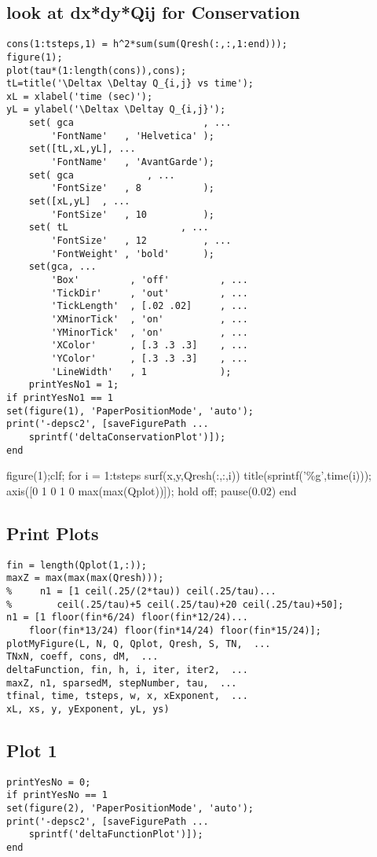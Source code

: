 \subsection*{look at dx*dy*Qij for Conservation}

\begin{verbatim}
cons(1:tsteps,1) = h^2*sum(sum(Qresh(:,:,1:end)));
figure(1);
plot(tau*(1:length(cons)),cons);
tL=title('\Deltax \Deltay Q_{i,j} vs time');
xL = xlabel('time (sec)');
yL = ylabel('\Deltax \Deltay Q_{i,j}');
    set( gca                       , ...
        'FontName'   , 'Helvetica' );
    set([tL,xL,yL], ...
        'FontName'   , 'AvantGarde');
    set( gca             , ...
        'FontSize'   , 8           );
    set([xL,yL]  , ...
        'FontSize'   , 10          );
    set( tL                    , ...
        'FontSize'   , 12          , ...
        'FontWeight' , 'bold'      );
    set(gca, ...
        'Box'         , 'off'         , ...
        'TickDir'     , 'out'         , ...
        'TickLength'  , [.02 .02]     , ...
        'XMinorTick'  , 'on'          , ...
        'YMinorTick'  , 'on'          , ...
        'XColor'      , [.3 .3 .3]    , ...
        'YColor'      , [.3 .3 .3]    , ...
        'LineWidth'   , 1             );
    printYesNo1 = 1;
if printYesNo1 == 1
set(figure(1), 'PaperPositionMode', 'auto');
print('-depsc2', [saveFigurePath ...
    sprintf('deltaConservationPlot')]);
end
\end{verbatim}
\begin{par}
figure(1);clf; for i = 1:tsteps     surf(x,y,Qresh(:,:,i))     title(sprintf('\%g',time(i)));     axis([0 1 0 1 0 max(max(Qplot))]);     hold off;     pause(0.02) end
\end{par} \vspace{1em}


\subsection*{Print Plots}

\begin{verbatim}
fin = length(Qplot(1,:));
maxZ = max(max(max(Qresh)));
%     n1 = [1 ceil(.25/(2*tau)) ceil(.25/tau)...
%        ceil(.25/tau)+5 ceil(.25/tau)+20 ceil(.25/tau)+50];
n1 = [1 floor(fin*6/24) floor(fin*12/24)...
    floor(fin*13/24) floor(fin*14/24) floor(fin*15/24)];
plotMyFigure(L, N, Q, Qplot, Qresh, S, TN,  ...
TNxN, coeff, cons, dM,  ...
deltaFunction, fin, h, i, iter, iter2,  ...
maxZ, n1, sparsedM, stepNumber, tau,  ...
tfinal, time, tsteps, w, x, xExponent,  ...
xL, xs, y, yExponent, yL, ys)
\end{verbatim}


\subsection*{Plot 1}

\begin{verbatim}
printYesNo = 0;
if printYesNo == 1
set(figure(2), 'PaperPositionMode', 'auto');
print('-depsc2', [saveFigurePath ...
    sprintf('deltaFunctionPlot')]);
end
\end{verbatim}

    
